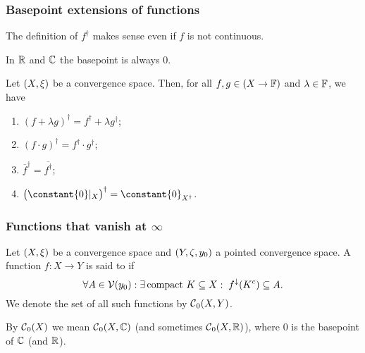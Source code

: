 \subsubsection{Basepoint extensions of functions}
The definition of $f^\dagger$ makes sense even if $f$ is not continuous.

In $\mathbb{R}$ and $\mathbb{C}$ the basepoint is always $0$.

\begin{lemma} \label{basepointExtensionToRingLemma}
Let $\sSet{X,\xi}$ be a convergence space. Then, for all $f,g\in (X\to \mathbb{F})$ and $\lambda\in \mathbb{F}$, we have
\begin{enumerate}
\item $(f+\lambda g)^\dagger = f^\dagger + \lambda g^\dagger$;
\item $(f\cdot g)^\dagger = f^\dagger\cdot g^\dagger$;
\item $\overline{f}^\dagger = \overline{f^\dagger}$;
\item $\big(\constant{0}|_X\big)^\dagger = \constant{0}_{X^\dagger}$.
\end{enumerate}
\end{lemma}



\subsubsection{Functions that vanish at $\infty$}
\begin{definition}
Let $\sSet{X,\xi}$ be a convergence space and $\sSet{Y,\zeta, y_0}$ a pointed convergence space. A function $f: X\to Y$ is said to  if
\[ \forall A\in \operatorname{\mathcal{V}}(y_0): \exists\, \text{compact $K\subseteq X$}: \; f^\downarrow(K^c) \subseteq A. \]
We denote the set of all such functions by $\operatorname{\mathcal{C}}_0(X,Y)$.

By $\operatorname{\mathcal{C}}_0(X)$ we mean $\operatorname{\mathcal{C}}_0(X,\mathbb{C})$ (and sometimes $\operatorname{\mathcal{C}}_0(X,\mathbb{R})$), where $0$ is the basepoint of $\mathbb{C}$ (and $\mathbb{R}$). 
\end{definition}

